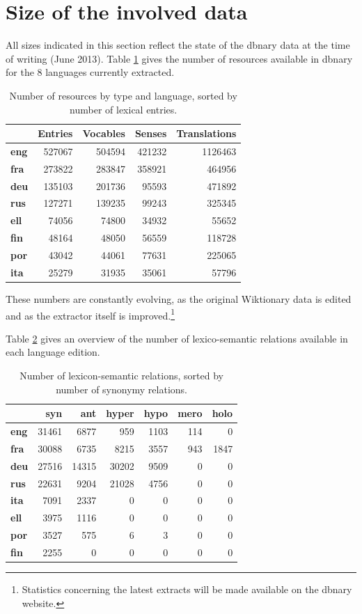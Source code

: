 \documentclass[sw]{iosart2c}
\begin{document}
\section{Size of the involved data}

All sizes indicated in this section reflect the state of the dbnary data at the time of writing (June 2013). Table \ref{globalsize} gives the number of resources available in dbnary for the 8 languages currently extracted.

\begin{table}[htb]
\begin{tabular}{lrrrr}
 & \textbf{Entries} & \textbf{Vocables} & \textbf{Senses} & \textbf{Translations}\\
 \hline
\textbf{eng} & 527067 & 504594 & 421232 & 1126463 \\
\textbf{fra} & 273822 & 283847 & 358921 & 464956 \\
\textbf{deu} & 135103 & 201736 & 95593 & 471892 \\
\textbf{rus} & 127271 & 139235 & 99243 & 325345 \\
\textbf{ell} & 74056 & 74800 & 34932 & 55652 \\
\textbf{fin} & 48164 & 48050 & 56559 & 118728 \\
\textbf{por} & 43042 & 44061 & 77631 & 225065 \\
\textbf{ita} & 25279 & 31935 & 35061 & 57796 \\
\end{tabular}
\caption{Number of resources by type and language, sorted by number of lexical entries.}\label{globalsize}
\end{table}

These numbers are constantly evolving, as the original Wiktionary data is edited and as the extractor itself is improved.\footnote{Statistics concerning the latest extracts will be made available on the dbnary website.}


Table \ref{nymsize} gives an overview of the number of lexico-semantic relations available in each language edition.

\begin{table}[htb]
\begin{tabular}{lrrrrrr}
 & \textbf{syn}  & \textbf{ant} & \textbf{hyper} & \textbf{hypo} & \textbf{mero} & \textbf{holo} \\
 \hline
\textbf{eng} & 31461& 6877& 959& 1103& 114& 0 \\ 
\textbf{fra} & 30088& 6735& 8215& 3557& 943& 1847 \\ 
\textbf{deu} & 27516& 14315& 30202& 9509& 0& 0 \\ 
\textbf{rus} & 22631& 9204& 21028& 4756& 0& 0 \\ 
\textbf{ita} & 7091& 2337& 0& 0& 0& 0 \\ 
\textbf{ell} & 3975& 1116& 0& 0& 0& 0 \\ 
\textbf{por} & 3527& 575& 6& 3& 0& 0 \\ 
\textbf{fin} & 2255& 0& 0& 0& 0& 0 \\ 
\end{tabular}
\caption{Number of lexicon-semantic relations, sorted by number of synonymy relations.}\label{nymsize}
\end{table}
\end{document}
